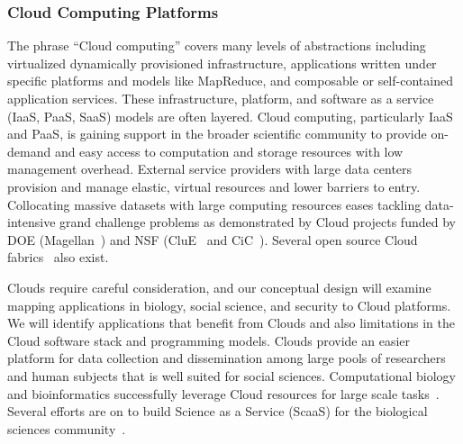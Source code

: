 \subsubsection{Cloud Computing Platforms}
The phrase ``Cloud computing'' covers many levels of abstractions including virtualized dynamically
provisioned infrastructure, applications written under specific platforms and models like MapReduce,
and composable or self-contained application services. 
These infrastructure, platform, and software
as a service (IaaS, PaaS, SaaS) models are often layered. 
Cloud computing, particularly IaaS and
PaaS, is gaining support in the broader scientific community to provide on-demand and easy access
to computation and storage resources with low management overhead. 
External service providers with large data centers provision and manage elastic, 
virtual resources and lower barriers to entry.
Collocating massive datasets with large computing resources eases tackling
data-intensive grand challenge problems as demonstrated by Cloud projects
funded by DOE (Magellan~\cite{magellan}) and NSF (CluE~\cite{CluE} and
CiC~\cite{CiC}). 
Several open source Cloud fabrics~\cite{Euca, Nimbus} also exist.

Clouds require careful consideration, and our conceptual design will examine mapping applications
in biology, social science, and security to Cloud platforms. 
We will identify applications
that benefit from Clouds and also limitations in the Cloud software stack and programming models.
Clouds provide an easier platform for data collection and dissemination among large
pools of researchers and human subjects that is well suited for social sciences.
Computational biology and bioinformatics successfully leverage Cloud resources for
large scale tasks~\cite{langmead:Cloudsnp:2009, lu:azureblast:2010}.
Several efforts are on to build Science as a Service (ScaaS) for the biological
sciences community~\cite{carmen,myexperiment,Afgan2011}.

